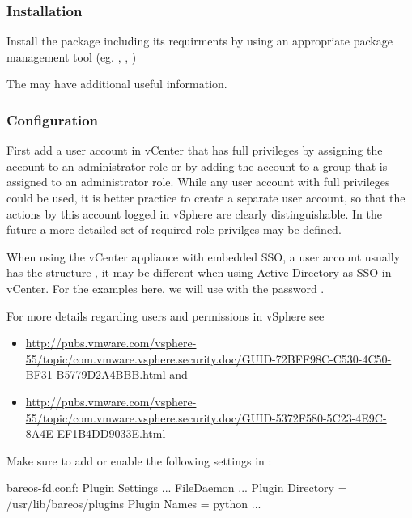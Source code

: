 \subsubsection{Installation}

Install the package  including its requirments
by using an appropriate package management tool
(eg. , , )

The  may have additional
useful information.

\subsubsection{Configuration}

First add a user account in vCenter that has full privileges by assigning
the account to an administrator role or by adding the account to a group
that is assigned to an administrator role. While any user account
with full privileges could be used, it is better practice to create a separate
user account, so that the actions by this account logged in vSphere are clearly
distinguishable. In the future a more detailed set of required role privilges
may be defined.

When using the vCenter appliance with embedded SSO, a user account usually has the
structure , it may be different when using
Active Directory as SSO in vCenter. For the examples here, we will use
 with the password .

For more details regarding users and permissions in vSphere see
\begin{itemize}
    \item \url{http://pubs.vmware.com/vsphere-55/topic/com.vmware.vsphere.security.doc/GUID-72BFF98C-C530-4C50-BF31-B5779D2A4BBB.html} and
    \item \url{http://pubs.vmware.com/vsphere-55/topic/com.vmware.vsphere.security.doc/GUID-5372F580-5C23-4E9C-8A4E-EF1B4DD9033E.html}
\end{itemize}

Make sure to add or enable the following settings in :

\begin{bconfig}{bareos-fd.conf: Plugin Settings}
...
FileDaemon {
...
  Plugin Directory = /usr/lib/bareos/plugins
  Plugin Names = python
...
}
\end{bconfig}

